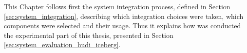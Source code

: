 This Chapter follows first the system integration process, defined in Section \ref{sec:system_integration}, describing which integration choices were taken, which components were selected and their usage. Thus it explains how was conducted the experimental part of this thesis, presented in Section \ref{sec:system_evaluation_hudi_iceberg}.